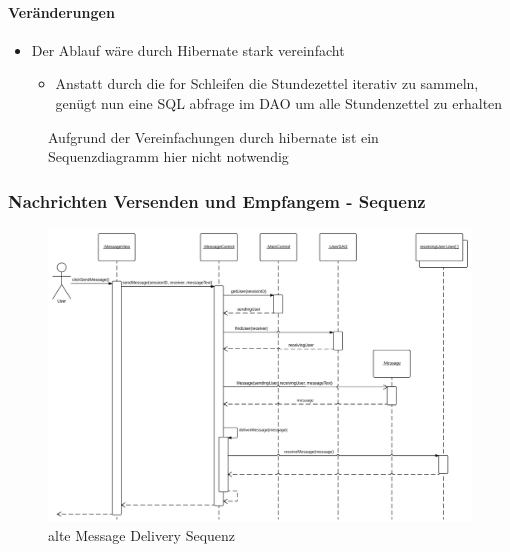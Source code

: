        \paragraph{Veränderungen}
        \begin{itemize}
            \item Der Ablauf wäre durch Hibernate stark vereinfacht
            \begin{itemize}
                \item Anstatt durch die for Schleifen die Stundezettel iterativ zu sammeln, genügt nun eine SQL abfrage im DAO um alle Stundenzettel zu erhalten
            \end{itemize}
        \end{itemize}

        \begin{figure}[H]
          \centering
           \caption{Aufgrund der Vereinfachungen durch hibernate ist ein Sequenzdiagramm hier nicht notwendig}
        \end{figure}

    \newpage
        \subsubsection{Nachrichten Versenden und Empfangem - Sequenz}

            \begin{figure}[H]
              \centering
                \includegraphics[scale=0.1]{Message-Delivery.pdf}
               \caption{alte Message Delivery Sequenz}
            \end{figure}


